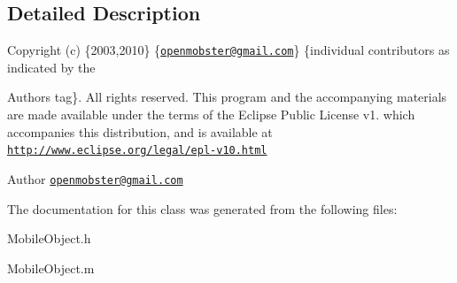 \subsection{\-Detailed \-Description}
\-Copyright (c) \{2003,2010\} \{\href{mailto:openmobster@gmail.com}{\tt openmobster@gmail.\-com}\} \{individual contributors as indicated by the \begin{DoxyAuthor}{\-Authors}
tag\}. \-All rights reserved. \-This program and the accompanying materials are made available under the terms of the \-Eclipse \-Public \-License v1. which accompanies this distribution, and is available at \href{http://www.eclipse.org/legal/epl-v10.html}{\tt http\-://www.\-eclipse.\-org/legal/epl-\/v10.\-html}
\end{DoxyAuthor}
\begin{DoxyAuthor}{\-Author}
\href{mailto:openmobster@gmail.com}{\tt openmobster@gmail.\-com} 
\end{DoxyAuthor}


\-The documentation for this class was generated from the following files\-:\begin{DoxyCompactItemize}
\item 
\-Mobile\-Object.\-h\item 
\-Mobile\-Object.\-m\end{DoxyCompactItemize}

